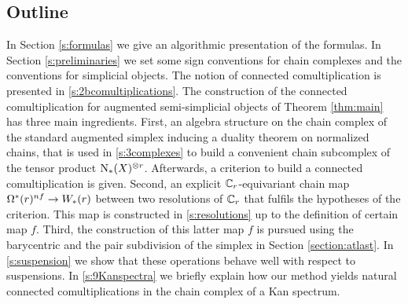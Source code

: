 

\subsection{Outline}
In Section \ref{s:formulas} we give an algorithmic presentation of the formulas. In Section \ref{s:preliminaries} we set some sign conventions for chain complexes and the conventions for simplicial objects. The notion of connected comultiplication is presented in \cref{s:2bcomultiplications}. The construction of the connected comultiplication for augmented semi-simplicial objects of Theorem \ref{thm:main} has three main ingredients.
First, an algebra structure on the chain complex of the standard augmented simplex inducing a duality theorem on normalized chains, that is used in \cref{s:3complexes} to build a convenient chain subcomplex of the tensor product $\operatorname{N}_{*}(X)^{\otimes r}$. Afterwards, a criterion to build a connected comultiplication is given.
Second, an explicit $\mathbb{C}_r$-equivariant chain map $\Omega^*(r)^{nf}\to W_*(r)$ between two resolutions of $\mathbb{C}_r$ that fulfils the hypotheses of the criterion. This map is constructed in \cref{s:resolutions} up to the definition of certain map $f$. Third, the construction of this latter map $f$ is pursued using the barycentric and the pair subdivision of the simplex in Section \ref{section:atlast}. In \cref{s:suspension} we show that these operations behave well with respect to suspensions. In \cref{s:9Kanspectra} we briefly explain how our method yields natural connected comultiplications in the chain complex of a Kan spectrum.